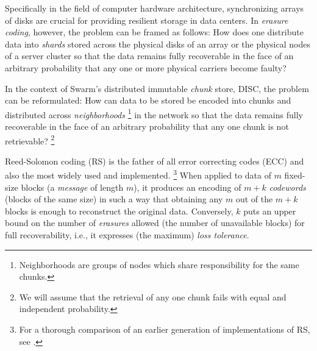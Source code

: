 \documentclass[manuscript,screen,review]{acmart}
\begin{document}
Specifically in the field of computer hardware architecture, synchronizing arrays of disks are crucial for providing resilient storage in data centers. %
%
In \emph{erasure coding}, %
%
%
however, the problem can be framed as follows: How does one distribute data into \textit{shards} stored across the physical disks of an array or the physical nodes of a server cluster so that the data remains fully recoverable in the face of an arbitrary probability that any one or more physical carriers become faulty?

In the context of Swarm's distributed immutable \textit{chunk} store, DISC, the problem can be reformulated: How can data to be stored be encoded into chunks and distributed across \textit{neighborhoods}%
%
\footnote{Neighborhoods are groups of nodes which share responsibility for the same chunks.}
%
in the network so that the data remains fully recoverable in the face of an arbitrary probability that any one chunk is not retrievable?%
%
\footnote{We will assume that the retrieval of any one chunk fails with equal and independent probability.}

Reed-Solomon coding (RS)  \citep{reed1960polynomial,lubyetal1995CRS,plank2006optimizing,li2013erasure}
is the father of all  error correcting codes (ECC) and also the most widely used and implemented.%
%
\footnote{%
For a thorough comparison of an earlier generation of implementations of RS, see \citet{plank2009performance}.}
%
When applied to data of $m$ fixed-size blocks (a \emph{message} of length $m$), it produces an encoding of $m+k$ \emph{codewords} (blocks of the same size) in such a way that obtaining any $m$ out of the $m+k$ blocks is enough to reconstruct the original data. Conversely, $k$ puts an upper bound on the number of \emph{erasures} allowed (the number of unavailable blocks) for full recoverability, i.e., it expresses (the maximum) \emph{loss tolerance}.
\end{document}
